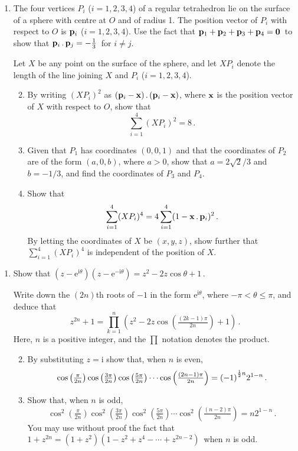 \documentclass[a4, 11pt]{report}
\newlength{\qspace}
\newcounter{qnumber}
\newenvironment{question}%
 {\vspace{\qspace}
  \begin{enumerate}[\bfseries 1\quad][10]%
    \setcounter{enumi}{\value{qnumber}}%
    \item%
 }
{
  \end{enumerate}
  \filbreak
  \stepcounter{qnumber}
 }
\newenvironment{questionparts}[1][1]%
 {
  \begin{enumerate}[\bfseries (i)]%
    \setcounter{enumii}{#1}
    \addtocounter{enumii}{-1}
    \setlength{\itemsep}{5mm}
    \setlength{\parskip}{8pt}
 }
 {
  \end{enumerate}
 }
\def\e{{\mathrm e}}
\def\i{{\mathrm i}}
\def\le{\leqslant}
\begin{document}
\begin{question}
The four vertices  $P_i$ ($i= 1, 2, 3, 4$) of a regular tetrahedron
lie on the surface of a sphere 
with centre at $O$ and of radius 1.  
The position vector of $P_i$ with respect to $O$ is ${\bf p}_i$
 ($i= 1, 2, 3, 4$). Use the fact             that
${\bf p}_1+ {\bf p}_2+{\bf p}_3+{\bf p}_4={\bf 0}\,$ 
to show that
 ${\bf p}_i \,.\, {\bf p}_j =-\frac13\,$
 for $i\ne j$. 

Let $X$ be any point on the surface of the sphere, and let
$XP_i$ denote the length of the line joining $X$ and $P_i$
 ($i= 1, 2, 3, 4$).

\begin{questionparts}
\item
By writing  $(XP_i) ^2$ as $({\bf p}_i- {\bf x)}\,.\,({\bf p}_i- {\bf x})$,
where ${\bf x}$ is the position vector of $X$ with respect to $O$,
 show that  
 \[
\sum_{i=1}^4(XP_i) ^2 =8\,.
\]

\item Given that $P_1$ has coordinates $(0,0,1)$ and that 
the coordinates of $P_2$ are of the form $(a,0,b)$, where $a>0$,
show that  $a=2\sqrt2/3$ and $b=-1/3$,
 and find the coordinates of $P_3$ and $P_4$. 
\item Show that 
\[
\sum_{i=1}^4 (XP_i)^4 = 4 \sum_{i=1}^4 (1- {\bf x}\,.\,{\bf p}_i)^2\,.
\]
By letting the coordinates of $X$ be $ (x,y,z)$, show further that $
\sum\limits_{i=1}^4 (XP_i)^4$ is independent of the position of $X$.

\end{questionparts}
\end{question}

\begin{question}
Show that $(z-\e^{\i\theta})(z-\e^{-\i\theta})=z^2 -2z\cos\theta +1\,$.

Write down the $(2n)$th roots of $-1$ in the form $\e^{\i\theta}$, where
$-\pi <\theta \le \pi$, and deduce that
\[
z^{2n} +1 
= \prod_{k=1}^n \left(z^2-2z \cos\left( \tfrac{(2k-1)\pi}{2n}\right) +1\right)
\,.
\]
Here, $n$ is a positive integer, and the $\prod$ notation denotes the product.
 
\begin{questionparts}
\item By substituting $z=\i$ show that, when $n$ is even,
\[
\cos  \left(\tfrac \pi {2n}\right) 
\cos  \left(\tfrac {3\pi} {2n}\right) 
\cos  \left(\tfrac {5\pi} {2n}\right) 
\cdots
\cos  \left(\tfrac{(2n-1) \pi} {2n}\right) 
 = {(-1\vphantom{\dot A})}^{\frac12 n} 2^{1-n}
\,.
\]
\item 
Show that, when $n$ is odd,       
\[
\cos^2  \left(\tfrac \pi {2n}\right) 
\cos ^2 \left(\tfrac {3\pi} {2n}\right) 
\cos ^2 \left(\tfrac {5\pi} {2n}\right) 
\cdots
\cos ^2 \left(\tfrac{(n-2) \pi} {2n}\right) 
= n 2^{1-n} 
\,.
\]
 You may use without proof         
the fact that
$1+z^{2n}= (1+z^2)(1-z^2+z^4 - \cdots + z^{2n-2})\,$
 when $n$ is odd.

\end{questionparts}
\end{question}
\end{document}
